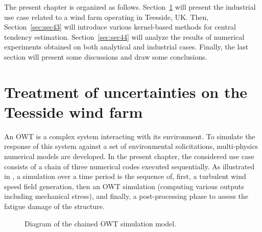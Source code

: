 The present chapter is organized as follows. 
Section~\ref{sec:sec42} will present the industrial use case related to a wind farm operating in Teesside, UK. 
Then, Section~\ref{sec:sec43} will introduce various kernel-based methods for central tendency estimation. 
Section~\ref{sec:sec44} will analyze the results of numerical experiments obtained on both analytical and industrial cases. 
Finally, the last section will present some discussions and draw some conclusions.


\section{Treatment of uncertainties on the Teesside wind farm}\label{sec:sec42}

An OWT is a complex system interacting with its environment. 
To simulate the response of this system against a set of environmental solicitations, multi-physics numerical models are developed. 
In the present chapter, the considered use case consists of a chain of three numerical codes executed sequentially. 
As illustrated in , a simulation over a time period is the sequence of, first, a turbulent wind speed field generation, then an OWT simulation (computing various outputs including mechanical stress), and finally, a post-processing phase to assess the fatigue damage of the structure.
\begin{figure}
\begin{center}
    
\end{center}
\caption{Diagram of the chained OWT simulation model.}
\label{fig:bloc_diagram}
\end{figure}


